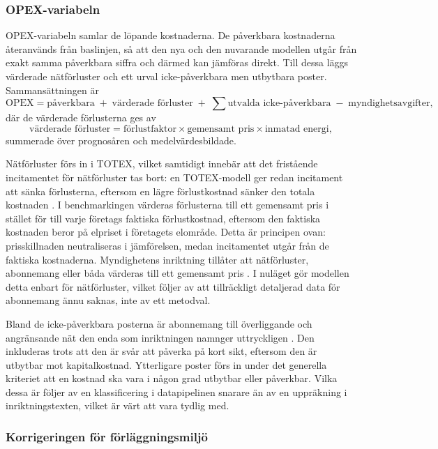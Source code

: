 \documentclass[11pt,a4paper]{article}
\begin{document}
\subsubsection{OPEX-variabeln}

OPEX-variabeln samlar de löpande kostnaderna. De påverkbara kostnaderna återanvänds från
baslinjen, så att den nya och den nuvarande modellen utgår från exakt samma påverkbara siffra och
därmed kan jämföras direkt. Till dessa läggs värderade nätförluster och ett urval icke-påverkbara
men utbytbara poster. Sammansättningen är
\[
  \mathrm{OPEX} = \text{påverkbara} \;+\; \text{värderade förluster}
  \;+\; \sum \text{utvalda icke-påverkbara} \;-\; \text{myndighetsavgifter},
\]
där de värderade förlusterna ges av
\[
  \text{värderade förluster} = \text{förlustfaktor} \times \text{gemensamt pris} \times
  \text{inmatad energi},
\]
summerade över prognosåren och medelvärdesbildade.

Nätförluster förs in i TOTEX, vilket samtidigt innebär att det fristående incitamentet för
nätförluster tas bort: en TOTEX-modell ger redan incitament att sänka förlusterna, eftersom en
lägre förlustkostnad sänker den totala kostnaden \citep{Ei2025Tillampning}. I benchmarkingen värderas förlusterna till ett
gemensamt pris i stället för till varje företags faktiska förlustkostnad, eftersom den faktiska
kostnaden beror på elpriset i företagets elområde. Detta är principen ovan: prisskillnaden
neutraliseras i jämförelsen, medan incitamentet utgår från de faktiska kostnaderna. Myndighetens
inriktning tillåter att nätförluster, abonnemang eller båda värderas till ett gemensamt pris \citeyearpar{Ei2025Benchmarking}. I
nuläget gör modellen detta enbart för nätförluster, vilket följer av att tillräckligt detaljerad
data för abonnemang ännu saknas, inte av ett metodval.

Bland de icke-påverkbara posterna är abonnemang till överliggande och angränsande nät den enda
som inriktningen namnger uttryckligen \citeyearpar{Ei2025Benchmarking}. Den inkluderas trots att den är svår att påverka på kort
sikt, eftersom den är utbytbar mot kapitalkostnad. Ytterligare poster förs in under det generella
kriteriet att en kostnad ska vara i någon grad utbytbar eller påverkbar. Vilka dessa är följer av
en klassificering i datapipelinen snarare än av en uppräkning i inriktningstexten, vilket är värt
att vara tydlig med.

\subsubsection{Korrigeringen för förläggningsmiljö}
\end{document}
